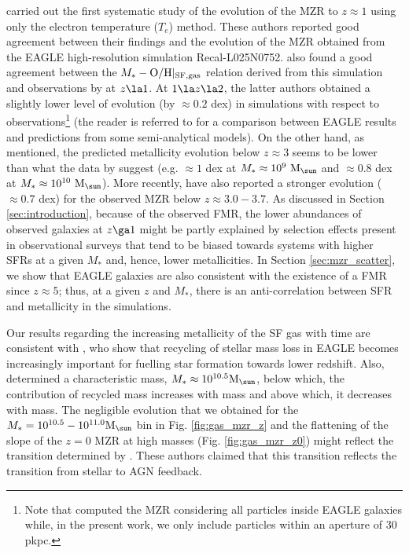 \documentclass[useAMS,usenatbib]{mn2e}
\begin{document}
\citet{ly2016} carried out the first systematic study of the evolution 
of the MZR to $z \approx 1$ using only the electron temperature ($T_{e}$) method.
These authors reported good agreement between their findings and
the evolution of the MZR obtained from the {\sc EAGLE} high-resolution simulation Recal-L025N0752.
\citet{guo2016} also found a good agreement between the $M_* - {\rm O/H}|_{\rm SF,gas}$ relation
derived from this simulation
and observations by \citet{zahid2013b} at $z\la 1$. At $1 \la z \la 2$, the latter authors
obtained a slightly lower level of
evolution (by $\approx 0.2$ dex) in simulations with respect to observations\footnote{ 
Note that \citet{guo2016} computed the MZR considering all particles inside 
{\sc EAGLE} galaxies while, in the present work, we only include particles within an aperture of 30 pkpc.}
(the reader is referred to \citealt{guo2016} for a comparison between {\sc EAGLE} results and predictions
from some semi-analytical models).
On the other hand, as mentioned, the predicted metallicity evolution below $z\approx3$ seems to be 
lower than what the data by \citet{maiolino2008} suggest
(e.g. $\approx 1$ dex at $M_* \approx 10^9 \ {\rm M}_{\sun}$ and $\approx 0.8$ dex at $M_* \approx 10^{10} \ {\rm M}_{\sun}$).
More recently, \citet{onodera2016} have also reported a stronger evolution ($\approx 0.7$ dex) for the observed MZR below $z \approx 3.0-3.7$. 
As discussed in Section \ref{sec:introduction}, because of the observed FMR, the lower abundances of
observed galaxies at $z \ga 1$ might  be partly explained by selection effects present 
in observational surveys that tend to be biased towards systems with higher SFRs at a given $M_*$ and, 
hence, lower metallicities. In Section \ref{sec:mzr_scatter}, we show that {\sc EAGLE}
galaxies are also consistent with the existence of a FMR since $z \approx 5$; 
thus, at a given $z$ and $M_*$, there is an anti-correlation between SFR and metallicity 
in the simulations. 


Our results regarding the increasing metallicity of the SF gas with time 
are consistent with \citet{segers2016b}, who show that recycling of stellar mass loss 
in {\sc EAGLE} becomes increasingly important
for fuelling star formation towards lower redshift.
Also, \citet{segers2016b} determined a characteristic mass, $M_* \approx 10^{10.5} {\rm M_{\sun}}$, 
below which,
the contribution of recycled mass increases with mass and above which,
it decreases with mass.
The negligible evolution that we obtained for the $M_* = 10^{10.5} - 10^{11.0} {\rm M}_{\sun}$ bin in 
Fig. \ref{fig:gas_mzr_z} and the flattening of the slope of the $z=0$ MZR at high masses (Fig. \ref{fig:gas_mzr_z0}) 
might reflect the transition determined by \citet{segers2016b}.
These authors claimed that 
this transition reflects the transition from stellar to AGN feedback.
\end{document}
